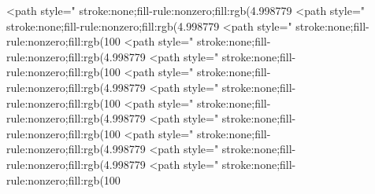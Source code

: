 <path style=" stroke:none;fill-rule:nonzero;fill:rgb(4.998779%
<path style=" stroke:none;fill-rule:nonzero;fill:rgb(4.998779%
<path style=" stroke:none;fill-rule:nonzero;fill:rgb(100%
<path style=" stroke:none;fill-rule:nonzero;fill:rgb(4.998779%
<path style=" stroke:none;fill-rule:nonzero;fill:rgb(100%
<path style=" stroke:none;fill-rule:nonzero;fill:rgb(4.998779%
<path style=" stroke:none;fill-rule:nonzero;fill:rgb(100%
<path style=" stroke:none;fill-rule:nonzero;fill:rgb(4.998779%
<path style=" stroke:none;fill-rule:nonzero;fill:rgb(100%
<path style=" stroke:none;fill-rule:nonzero;fill:rgb(4.998779%
<path style=" stroke:none;fill-rule:nonzero;fill:rgb(4.998779%
<path style=" stroke:none;fill-rule:nonzero;fill:rgb(100%
